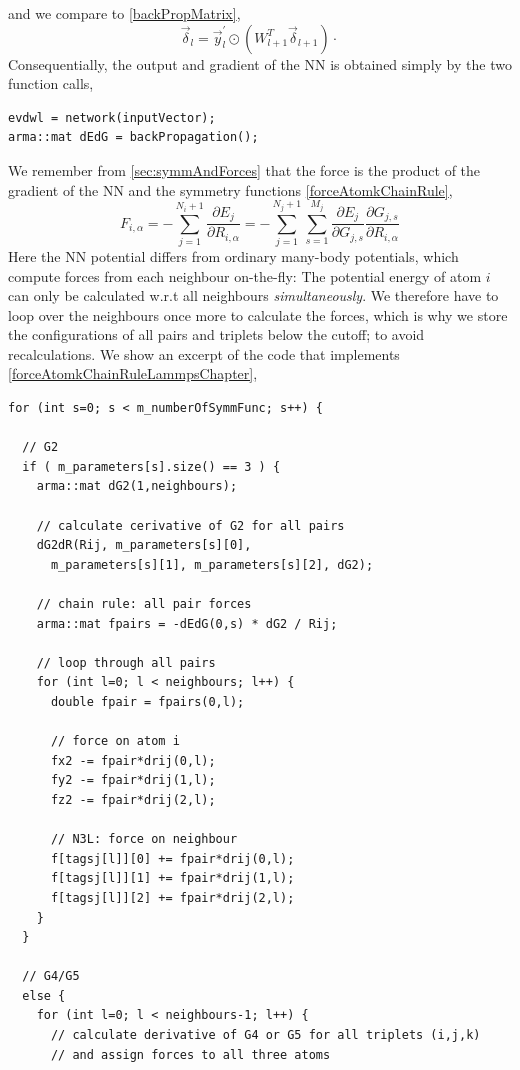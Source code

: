 \documentclass[twoside,english]{uiofysmaster}
\begin{document}
and we compare to \eqref{backPropMatrix},
\begin{equation}
 \vec{\delta}_l = \vec{y}^\prime_l \odot (W^T_{l+1}\vec{\delta}_{l+1}) \cdot 
 \label{backPropMatrixLammpsChapter}
\end{equation}
Consequentially, the output and gradient of the NN is obtained simply by the two function calls,
\begin{verbatim}
evdwl = network(inputVector);
arma::mat dEdG = backPropagation();
\end{verbatim}
We remember from \autoref{sec:symmAndForces} that the force is the product of the gradient of the NN and 
the symmetry functions \eqref{forceAtomkChainRule},
\begin{equation}
 F_{i,\alpha} = -\sum_{j=1}^{N_i+1}\frac{\partial E_j}{\partial R_{i,\alpha}} = 
 -\sum_{j=1}^{N_j+1}\sum_{s=1}^{M_j}\frac{\partial E_j}{\partial G_{j,s}}\frac{\partial G_{j,s}}{\partial R_{i,\alpha}}
 \label{forceAtomkChainRuleLammpsChapter}
\end{equation}
Here the NN potential differs from ordinary many-body potentials, which 
compute forces from each neighbour on-the-fly: The potential energy of atom $i$
can only be calculated w.r.t all neighbours \textit{simultaneously}. We therefore have to loop over the neighbours once more
to calculate the forces, which is why we store the configurations of all pairs and triplets below the cutoff; to 
avoid recalculations. We show an excerpt of the code that implements \eqref{forceAtomkChainRuleLammpsChapter},
\begin{verbatim}
for (int s=0; s < m_numberOfSymmFunc; s++) {

  // G2
  if ( m_parameters[s].size() == 3 ) {
    arma::mat dG2(1,neighbours);

    // calculate cerivative of G2 for all pairs
    dG2dR(Rij, m_parameters[s][0],
	  m_parameters[s][1], m_parameters[s][2], dG2);

    // chain rule: all pair forces
    arma::mat fpairs = -dEdG(0,s) * dG2 / Rij;

    // loop through all pairs
    for (int l=0; l < neighbours; l++) {
      double fpair = fpairs(0,l);

      // force on atom i
      fx2 -= fpair*drij(0,l);
      fy2 -= fpair*drij(1,l);
      fz2 -= fpair*drij(2,l);

      // N3L: force on neighbour
      f[tagsj[l]][0] += fpair*drij(0,l);
      f[tagsj[l]][1] += fpair*drij(1,l);
      f[tagsj[l]][2] += fpair*drij(2,l);
    }
  }

  // G4/G5
  else {
    for (int l=0; l < neighbours-1; l++) {
      // calculate derivative of G4 or G5 for all triplets (i,j,k)
      // and assign forces to all three atoms
\end{verbatim}
\end{document}
